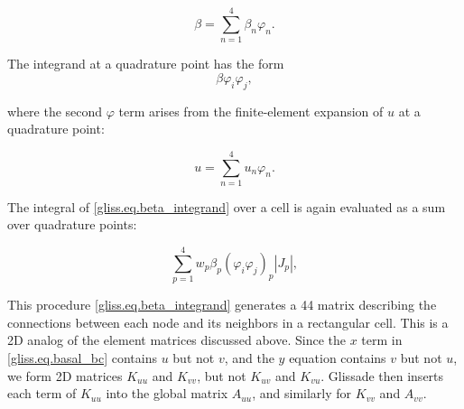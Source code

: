 \begin{equation}
  \beta = \sum\limits_{n=1}^{4} {\beta_n \varphi_n}.
\end{equation}

\noindent
The integrand at a quadrature point has the form
\begin{equation}
  \label{gliss.eq.beta_integrand}
  \beta \varphi_i \varphi_j,
\end{equation}

\noindent
where the second $\varphi$ term arises from the finite-element expansion of $u$ at a quadrature point:

\begin{equation}
  u = \sum\limits_{n=1}^{4} {u_n \varphi_n}.
\end{equation}

The integral of \eqref{gliss.eq.beta_integrand} over a cell is again evaluated as a sum over quadrature points:

\begin{equation}
  \label{gliss.eq.sum_over_qp_beta}
  \sum\limits_{p=1}^{4} {w_p \beta_p (\varphi_i \varphi_j)_p |J_p|},
\end{equation}

\noindent
This procedure \eqref{gliss.eq.beta_integrand} generates a 44 matrix
describing the connections between each node and its neighbors in a rectangular cell.
This is a 2D analog of the element matrices discussed above.  Since the $x$ term in
\eqref{gliss.eq.basal_bc} contains $u$ but not $v$, and the $y$ equation contains
$v$ but not $u$, we form 2D matrices $K_{uu}$ and $K_{vv}$, but not $K_{uv}$ and $K_{vu}$.
Glissade then inserts each term of $K_{uu}$ into the global matrix $A_{uu}$, and
similarly for $K_{vv}$ and $A_{vv}$.






